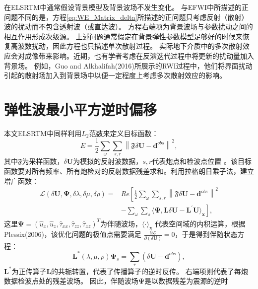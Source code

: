 在ELSRTM中通常假设背景模型及背景波场不发生变化。%
与EFWI中所描述的正问题不同的是，方程\eqref{eq:WE_Matrix_delta}所描述的正问题只考虑反射（散射）波的扰动而不包含透射波（或直达波）。
方程右端项为背景波场与参数扰动之间的相互作用形成次级源。
上述问题通常假定在背景弹性参数模型足够好的时候来恢复高波数扰动，因此方程也只描述单次散射过程。
实际地下介质中的多次散射效应会对成像带来影响。近期，也有学者考虑在反演迭代过程中将更新的扰动量加入背景场。
例如，Guo and
Alkhalifah(2016)\cite{Guo2016}所展示的RWI过程中，他们将界面扰动引起的散射场加入到背景场中以便一定程度上考虑多次散射效应的影响。
\section{弹性波最小平方逆时偏移}
本文ELSRTM中同样利用$L_2$范数来定义目标函数：
\begin{equation}
    E=\frac{1}{2}\sum_{\omega}\sum_{s,r}\left\lVert \mathfrak{F}\delta \mathbf{U}-\mathbf{d}^{obs} \right \rVert^2,
    \label{eq:misfit_LSRTM}
\end{equation}
其中$\mathfrak{F}$为采样函数，$\delta\mathbf{U}$为模拟的反射波数据，$s,r$代表炮点和检波点位置
。该目标函数要对所有频率、所有炮检对的反射数据残差求和。利用拉格朗日乘子法，建立增广函数：
\begin{equation}
\begin{split}
    \mathcal{L}(\delta\mathbf{U},\bm\Psi,\delta\lambda,\delta\mu,\delta\rho)=&Re\left[
	\frac{1}{2}\sum_{\omega}\sum_{s,r}\left\lVert \mathfrak{F}\delta \mathbf{U}-\mathbf{d}^{obs} \right \rVert^2 \right. \\
	&\left.-\sum_{\omega}\sum_{s}\langle\bm\Psi,\mathbf{L}\delta\mathbf{U}-\mathbf{L}^{'}\mathbf{U}\rangle_{\mathbf{x}}\right],
    \label{eq:Lagrangian_LSRTM}
\end{split}
\end{equation}
这里$\bm\Psi=(\hat {u}_x,\hat {u}_z,\hat{\tau}_{xx},\hat{\tau}_{zz},\hat{\tau}_{xz})^T$为伴随波场，$\langle\cdot\rangle_\mathbf{x}$
代表空间域的内积运算，根据Plessix(2006)\cite{plessix2006}，该优化问题的极值点需要满足
$\frac{\partial\mathcal{L}}{\partial(\delta\mathbf{U})}=0$，于是得到伴随状态方程：
\begin{equation}
	\mathbf{L}^*(\lambda,\mu,\rho)\bm\Psi_s=\sum_{r}(\delta\mathbf{U}-\mathbf{d}^{obs}),
    \label{eq:Adjoint_LSRTM} 
\end{equation}
$\mathbf{L}^*$为正传算子$\mathbf{L}$的共轭转置，代表了传播算子的逆时反传。
右端项则代表了每炮数据检波点处的残差波场。
因此，伴随波场$\bm\Psi$是以数据残差为震源的逆时
